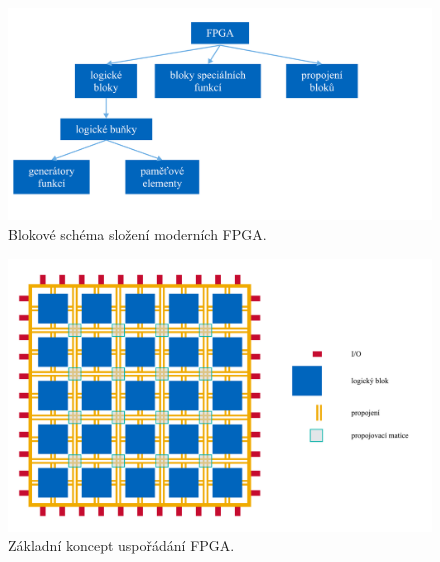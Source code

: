 \documentclass[a4paper, twoside, 11pt]{article}
\newcommand{\fbar}{\FloatBarrier}
\begin{document}
		\begin{figure}[htbp!]
			\centering
				\includegraphics[width=1\textwidth]{src/pdf/fpga-skladba.pdf} 
				\caption{Blokové schéma složení moderních FPGA.}
				\label{fig:fpga-skladba}
		\end{figure}


		\begin{figure}[htbp!]
			\centering
				\includegraphics[width=1\textwidth]{src/pdf/fpga-general-design.pdf} 
				\caption{Základní koncept uspořádání FPGA.}
				\label{fig:fpga-general-design}
		\end{figure}

		\fbar
\end{document}

